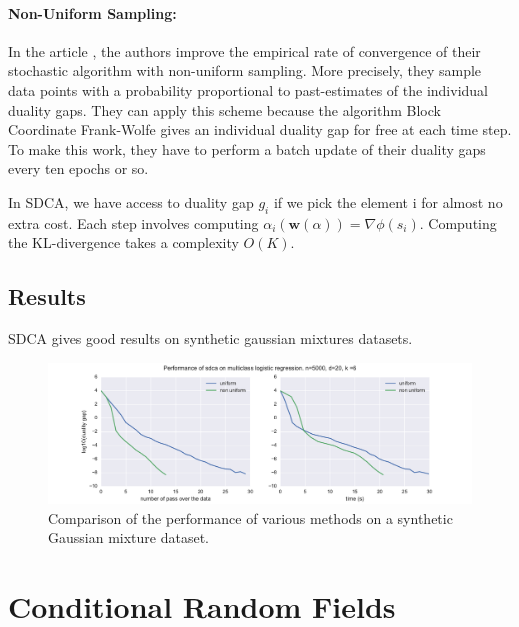 \documentclass{article}
\DeclareMathOperator{\1}{\mathbb{1}}
\begin{document}
\paragraph{Non-Uniform Sampling:} 
In the article \cite{osokin_minding_2016}, the authors improve the empirical rate of convergence of their stochastic algorithm with non-uniform sampling.
More precisely, they sample data points with a probability proportional to past-estimates of the individual duality gaps.
They can apply this scheme because the algorithm Block Coordinate Frank-Wolfe \cite{lacoste-julien_block-coordinate_2012} gives an individual duality gap for free at each time step.
To make this work, they have to perform a batch update of their duality gaps every ten epochs or so.

In SDCA, we have access to duality gap $g_i$ if we pick the element i for almost no extra cost.
Each step involves computing $\alpha_i(\bm w(\alpha))=\nabla\phi(s_i)$.
Computing the KL-divergence takes a complexity $O(K)$.

\subsection{Results}

SDCA gives good results on synthetic gaussian mixtures datasets. 
\begin{figure}[ht]
	\label{gmm results}
	\includegraphics[width=\textwidth]{images/nonuniform_is_better.pdf}
	\caption{Comparison of the performance of various methods on a synthetic Gaussian mixture dataset.}
\end{figure}



\clearpage
\section{Conditional Random Fields}
\end{document}

